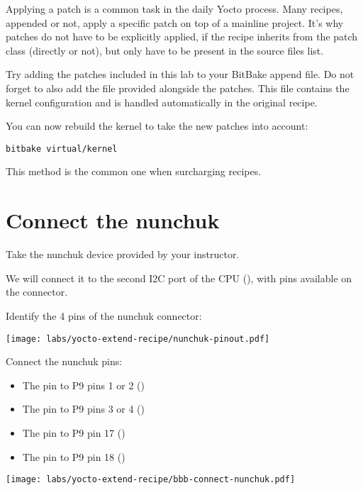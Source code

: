 Applying a patch is a common task in the daily Yocto process. Many recipes,
appended or not, apply a specific patch on top of a mainline project. It's why
patches do not have to be explicitly applied, if the recipe inherits from the
patch class (directly or not), but only have to be present in the source files
list.

Try adding the patches included in this lab to your BitBake append
file. Do not forget to also add the  file provided
alongside the patches. This file contains the kernel configuration and
is handled automatically in the  original
recipe.

You can now rebuild the  kernel to take the new
patches into account:
\begin{verbatim}
bitbake virtual/kernel
\end{verbatim}

This method is the common one when surcharging recipes.

\section{Connect the nunchuk}

Take the nunchuk device provided by your instructor.

We will connect it to the second I2C port of the CPU (),
with pins available on the  connector.

Identify the 4 pins of the nunchuk connector:

\begin{center}
\texttt{[image: labs/yocto-extend-recipe/nunchuk-pinout.pdf]}
\end{center}

Connect the nunchuk pins:
\begin{itemize}
\item The  pin to P9 pins 1 or 2 ()
\item The  pin to P9 pins 3 or 4 ()
\item The  pin to P9 pin 17 ()
\item The  pin to P9 pin 18 ()
\end{itemize}

\begin{center}
\texttt{[image: labs/yocto-extend-recipe/bbb-connect-nunchuk.pdf]}
\end{center}

